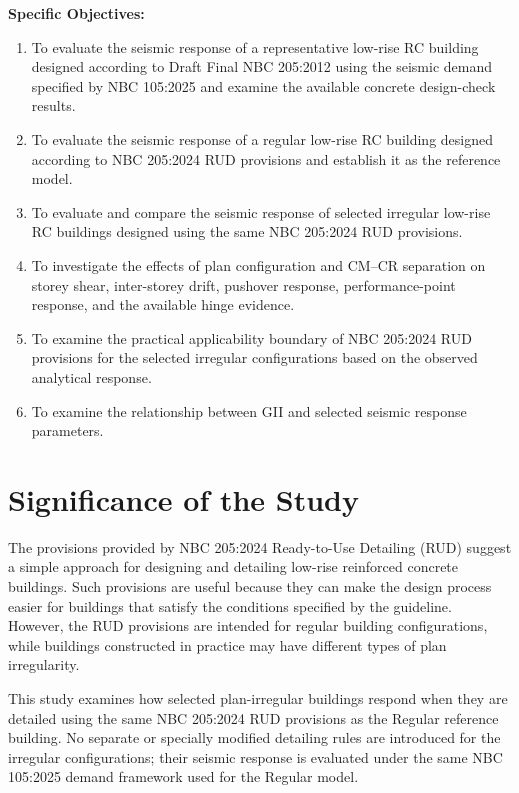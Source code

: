 \noindent\textbf{Specific Objectives:}
\begin{enumerate}[leftmargin=1.0cm,itemsep=0.25em,topsep=0.25em,parsep=0pt]
\item To evaluate the seismic response of a representative low-rise RC building designed according to Draft Final NBC 205:2012 using the seismic demand specified by NBC 105:2025 and examine the available concrete design-check results.
\item To evaluate the seismic response of a regular low-rise RC building designed according to NBC 205:2024 RUD provisions and establish it as the reference model.
\item To evaluate and compare the seismic response of selected irregular low-rise RC buildings designed using the same NBC 205:2024 RUD provisions.
\item To investigate the effects of plan configuration and CM--CR separation on storey shear, inter-storey drift, pushover response, performance-point response, and the available hinge evidence.
\item To examine the practical applicability boundary of NBC 205:2024 RUD provisions for the selected irregular configurations based on the observed analytical response.
\item To examine the relationship between GII and selected seismic response parameters.
\end{enumerate}

\section{Significance of the Study}
The provisions provided by NBC 205:2024 Ready-to-Use Detailing (RUD) suggest a simple approach for designing and detailing low-rise reinforced concrete buildings. Such provisions are useful because they can make the design process easier for buildings that satisfy the conditions specified by the guideline. However, the RUD provisions are intended for regular building configurations, while buildings constructed in practice may have different types of plan irregularity.

This study examines how selected plan-irregular buildings respond when they are detailed using the same NBC 205:2024 RUD provisions as the Regular reference building. No separate or specially modified detailing rules are introduced for the irregular configurations; their seismic response is evaluated under the same NBC 105:2025 demand framework used for the Regular model.

